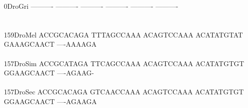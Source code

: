 \documentclass[11pt,twoside,reqno,a4paper]{article}
\begin{document}
{0\hspace*{4\charwidth}DroGri	----------	----------	----------	----------	----------	----------	\\
\hspace*{5\charwidth}\hspace*{7\charwidth}\hspace*{1\charwidth}\hspace*{1\charwidth}\hspace*{1\charwidth}\hspace*{1\charwidth}\hspace*{1\charwidth}\hspace*{1\charwidth}\\
\\
159\hspace*{2\charwidth}DroMel	ACCGCACAGA	TTTAGCCAAA	ACAGTCCAAA	ACATATGTAT	GAAAGCAACT	----AAAAGA	\\
\hspace*{5\charwidth}\hspace*{7\charwidth}\hspace*{1\charwidth}\hspace*{1\charwidth}\hspace*{1\charwidth}\hspace*{1\charwidth}\hspace*{1\charwidth}\hspace*{1\charwidth}\\
157\hspace*{2\charwidth}DroSim	ACCGCATAGA	TTCAGCCAAA	ACAGTCCAAA	ACATATGTGT	GGAAGCAACT	----AGAAG-	\\
\hspace*{5\charwidth}\hspace*{7\charwidth}\hspace*{1\charwidth}\hspace*{1\charwidth}\hspace*{1\charwidth}\hspace*{1\charwidth}\hspace*{1\charwidth}\hspace*{1\charwidth}\\
157\hspace*{2\charwidth}DroSec	ACCGCACAGA	GTCAACCAAA	ACAGTCCAAA	ACATATGTGT	GGAAGCAACT	----AGAAGA	\\
\hspace*{5\charwidth}\hspace*{7\charwidth}\hspace*{1\charwidth}\hspace*{1\charwidth}\hspace*{1\charwidth}\hspace*{1\charwidth}\hspace*{1\charwidth}\hspace*{1\charwidth}\\
}
\end{document}
